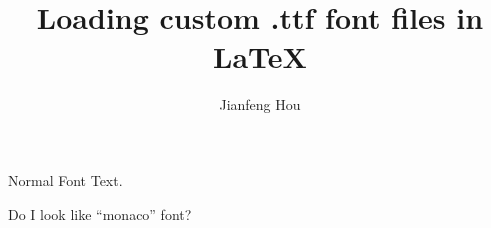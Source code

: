 \documentclass{article}
\title{Loading custom .ttf font files in \LaTeX}
\author{Jianfeng Hou}
\date{}
\begin{document}
\maketitle

Normal Font Text.

{\monaco Do I look like ``monaco'' font?}
\end{document}
